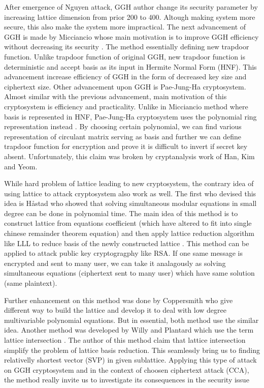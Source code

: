 After emergence of Nguyen attack, GGH author change its security parameter by increasing lattice dimension from prior 200 to 400. Altough making system more secure, this also make the system more impractical. The next advancement of GGH is made by Micciancio whose main motivation is to improve GGH efficiency without decreasing its security \cite{Mic08}. The method essentially defining new trapdoor function. Unlike trapdoor function of original GGH, new trapdoor function is deterministic and accept basis as its input in Hermite Normal Form (HNF). This advancement increase efficiency of GGH in the form of decreased key size and ciphertext size. Other advancement upon GGH is Pae-Jung-Ha cryptosystem. Almost similar with the previous advancement, main motivation of this cryptosystem is efficiency and practicality. Unlike in Micciancio method where basis is represented in HNF, Pae-Jung-Ha cryptosystem uses the polynomial ring representation instead \cite{Pjh03}. By choosing certain polynomial, we can find various representation of circulant matrix serving as basis and further we can define trapdoor function for encryption and prove it is difficult to invert if secret key absent. Unfortunately, this claim was broken by cryptanalysis work of Han, Kim and Yeom. 

While hard problem of lattice leading to new cryptosystem, the contrary idea of using lattice to attack cryptosystem also work as well. The first who devised this idea is H{\aa}stad who showed that solving simultaneous modular equations in small degree can be done in polynomial time. The main idea of this method is to construct lattice from equations coefficient (which have altered to fit into single chinese remainder theorem equation) and then apply lattice reduction algorithm like LLL to reduce basis of the newly constructed lattice \cite{Has88}. This method can be applied to attack public key cryptogragphy like RSA. If one same message is encrypted and sent to many user, we can take it analagously as solving simultaneous equations (ciphertext sent to many user) which have same solution (same plaintext).

Further enhancement on this method was done by Coppersmith who give different way to build the lattice and develop it to deal with low degree multivariable polynomial equations. But in essential, both method use the similar idea. Another method was developed by Willy and Plantard which use the term lattice intersection \cite{Wil12}. The author of this method claim that lattice intersection simplify the problem of lattice basis reduction. This seamlessly bring us to finding relativelly shortest vector (SVP) in given sublattice. Applying this type of attack on GGH cryptosystem and in the context of choosen ciphertext attack (CCA), the method really invite us to investigate its consequences in the security issue

